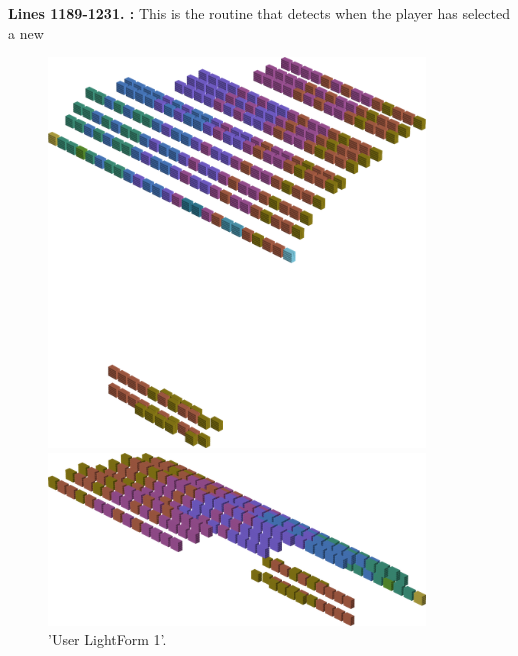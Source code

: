 \textbf{Lines 1189-1231. :} This is the routine that detects when the player has selected a new
\clearpage

\begin{figure}[H]
    \centering
    \begin{adjustbox}{width=10cm,center}
      \includegraphics[width=10cm]{src/colorspace_patterns/pattern9-45.png}%
    \end{adjustbox}
    \begin{adjustbox}{width=10cm}
      \includegraphics[width=10cm]{src/colorspace_patterns/pattern9-225.png}%
    \end{adjustbox}
\caption{'User LightForm 1'.}
\end{figure}
\clearpage


